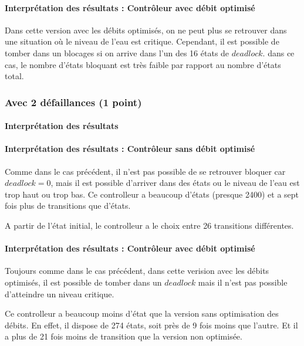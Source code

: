 \documentclass[a4paper]{book}
\begin{document}
\paragraph{Interprétation des résultats : Contrôleur avec débit optimisé}
Dans cette version avec les débits optimisés, on ne peut plus se retrouver dans une situation où le niveau de l'eau est critique. Cependant, il est possible de tomber dans un blocages si on arrive dans l'un des 16 états de $deadlock$.
dans ce cas, le nombre d'états bloquant est très faible par rapport au nombre d'états total.

\subsubsection{Avec 2 défaillances (1 point)}


%
%
%
\paragraph{Interprétation des résultats}
\paragraph{Interprétation des résultats : Contrôleur sans débit optimisé}
Comme dans le cas précédent, il n'est pas possible de se retrouver bloquer car $deadlock=0$, mais il est possible d'arriver dans des états ou le niveau de l'eau est trop haut ou trop bas.
Ce controlleur a beaucoup d'états (presque 2400) et a sept fois plus de transitions que d'états.

A partir de l'état initial, le controlleur a le choix entre 26 transitions différentes.
\paragraph{Interprétation des résultats : Contrôleur avec débit optimisé}
Toujours comme dans le cas précédent, dans cette verision avec les débits optimisés, il est possible de tomber dans un $deadlock$ mais il n'est pas possible d'atteindre un niveau critique.

Ce controlleur a beaucoup moins d'état que la version sans optimisation des débits. En effet, il dispose de 274 états, soit près de 9 fois moins que l'autre.
Et il a plus de 21 fois moins de transition que la version non optimisée.
\end{document}
